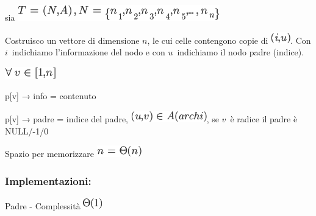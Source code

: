 \documentclass{article}
\begin{document}
{}

{}

{}

{}

{sia }\includegraphics{images/image100.png}

{Costruisco un vettore di dimensione
}$n${, le cui celle contengono copie di
}\includegraphics{images/image101.png}{. Con
}$i${~indichiamo l'informazione del
nodo e con }$u${~indichiamo il nodo
padre (indice).}

{}

\includegraphics{images/image104.png}

{p{[}v{]} → info = contenuto}

{p{[}v{]} → padre = indice del padre,
}\includegraphics{images/image105.png}{, se
}$v${~è radice il padre è NULL/-1/0}

{}

{Spazio per memorizzare }\includegraphics{images/image106.png}

{}

\hypertarget{h.ncrwkhkrovb2}{\subsubsection{\texorpdfstring{{Implementazioni:}}{Implementazioni:}}\label{h.ncrwkhkrovb2}}

{Padre - }{Complessità}\includegraphics{images/image107.png}

\protect\hypertarget{t.13d3d44b5647536d159823e4ed75c88728308b7e}{}{}\protect\hypertarget{t.5}{}{}
\end{document}
